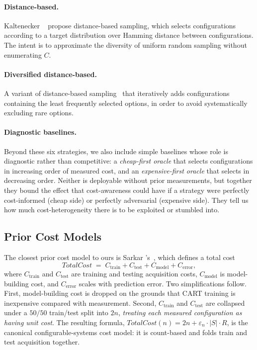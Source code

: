 \paragraph*{Distance-based.}
Kaltenecker \etal~\cite{kaltenecker2019} propose distance-based sampling, which
selects configurations according to a target distribution over Hamming distance
between configurations. The intent is to approximate the diversity of uniform
random sampling without enumerating $C$.

\paragraph*{Diversified distance-based.}
A variant of distance-based sampling~\cite{kaltenecker2019} that iteratively
adds configurations containing the least frequently selected options, in order
to avoid systematically excluding rare options.

\paragraph*{Diagnostic baselines.}
Beyond these six strategies, we also include simple baselines whose role is
diagnostic rather than competitive: a \emph{cheap-first oracle} that selects
configurations in increasing order of measured cost, and an
\emph{expensive-first oracle} that selects in decreasing order. Neither is
deployable without prior measurements, but together they bound the effect that
cost-awareness could have if a strategy were perfectly cost-informed (cheap
side) or perfectly adversarial (expensive side). They tell us how much
cost-heterogeneity there is to be exploited or stumbled into.

\subsection{Prior Cost Models}
\label{subsec:cost-models}

The closest prior cost model to ours is Sarkar \etal's~\cite{sarkar2015}, which
defines a total cost
\[
\mathit{TotalCost}\;=\;C_{\text{train}} + C_{\text{test}} + C_{\text{model}} + C_{\text{error}},
\]
where $C_{\text{train}}$ and $C_{\text{test}}$ are training and testing
acquisition costs, $C_{\text{model}}$ is model-building cost, and
$C_{\text{error}}$ scales with prediction error. Two simplifications follow.
First, model-building cost is dropped on the grounds that CART training is
inexpensive compared with measurement. Second, $C_{\text{train}}$ and
$C_{\text{test}}$ are collapsed under a $50/50$ train/test split into $2n$,
\emph{treating each measured configuration as having unit cost}. The resulting
formula, $\mathit{TotalCost}(n)=2n+\varepsilon_{n}\cdot|S|\cdot R$, is the
canonical configurable-systems cost model: it is count-based and folds train
and test acquisition together.

